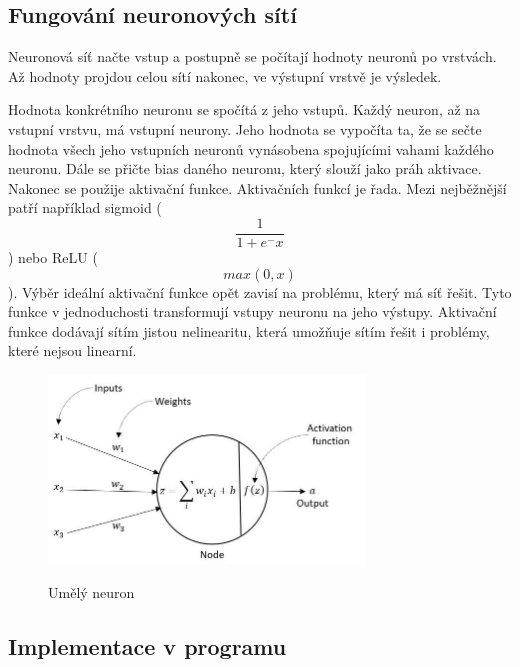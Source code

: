 \subsection{Fungování neuronových sítí}
Neuronová síť načte vstup a postupně se počítají hodnoty neuronů po vrstvách.
Až hodnoty projdou celou sítí nakonec, ve výstupní vrstvě je výsledek.

Hodnota konkrétního neuronu se spočítá z jeho vstupů. Každý neuron, až na vstupní vrstvu, má vstupní neurony.
Jeho hodnota se vypočíta ta, že se sečte hodnota všech jeho vstupních neuronů vynásobena spojujícími vahami každého neuronu.
Dále se přičte bias daného neuronu, který slouží jako práh aktivace. Nakonec se použije aktivační funkce.
Aktivačních funkcí je řada. Mezi nejběžnější patří například sigmoid (\[\frac{1}{1 + e^-x}\]) nebo ReLU (\[max(0,x)\]). Výběr ideální aktivační funkce opět zavisí na problému, který má síť řešit.
Tyto funkce v jednoduchosti transformují vstupy neuronu na jeho výstupy.
Aktivační funkce dodávají sítím jistou nelinearitu, která umožňuje sítím řešit i problémy, které nejsou linearní.

\begin{figure}[h]
    \centering
    \includegraphics[width=0.75\textwidth]{images/neuron.jpg}
    \caption{Umělý neuron}\cite{umely_neuron}
\end{figure}

\subsection{Implementace v programu}


